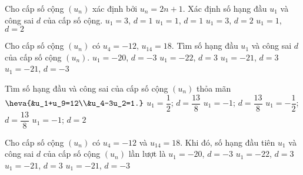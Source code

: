 \begin{ex}%
	Cho cấp số cộng $\left(u_n\right)$ xác định bởi $u_n=2n+1$. Xác định số hạng đầu $u_1$ và công sai $d$ của cấp số cộng.
	\choice
	{$u_1=3$, $d=1$}
	{$u_1=1$, $d=1$}
	{\True $u_1=3$, $d=2$}
	{$u_1=1$, $d=2$}
\end{ex}

\begin{ex}%
	Cho cấp số cộng $\left(u_n\right)$ có $u_4=-12$, $u_{14}=18$. Tìm số hạng đầu $u_1$ và công sai $d$ của cấp số cộng $\left(u_n\right)$. 
	\choice 
	{$u_1=-20$, $d=-3$}
	{$u_1=-22$, $d=3$ }
	{\True $u_1=-21$, $d=3$}
	{$u_1=-21$, $d=-3$}
\end{ex}

\begin{ex}%
	Tìm số hạng đầu và công sai của cấp số cộng $(u_n)$ thỏa mãn $\heva{&u_1+u_9=12\\&u_4-3u_2=1.}$
	\choice
	{$u_1=\dfrac{1}{2}$; $d=\dfrac{13}{8}$}
	{$u_1=-1$; $d=\dfrac{13}{8}$}
	{\True $u_1=-\dfrac{1}{2}$; $d=\dfrac{13}{8}$}
	{$u_1=-1$; $d=2$}
\end{ex}

\begin{ex}%
	Cho cấp số cộng $(u_n)$ có $u_4=-12$ và $u_{14} =18$. Khi đó, số hạng đầu tiên $u_1$ và công sai $d$ của cấp số cộng $(u_n)$ lần lượt là
	\choice
	{$u_1=-20$, $d=-3$}
	{$u_1=-22$, $d=3$}
	{\True $u_1=-21$, $d=3$}
	{$u_1=-21$, $d=-3$}
\end{ex}

